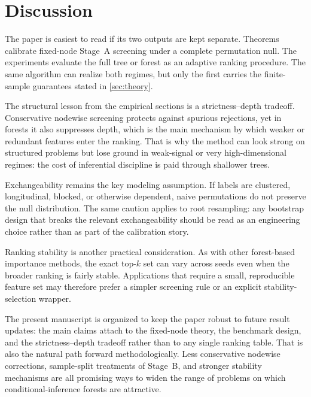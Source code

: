 \section{Discussion}
\label{sec:discussion}

The paper is easiest to read if its two outputs are kept separate. Theorems
calibrate fixed-node Stage~A screening under a complete permutation null. The
experiments evaluate the full tree or forest as an adaptive ranking procedure.
The same algorithm can realize both regimes, but only the first carries the
finite-sample guarantees stated in \cref{sec:theory}.

The structural lesson from the empirical sections is a strictness--depth
tradeoff. Conservative nodewise screening protects against spurious rejections,
yet in forests it also suppresses depth, which is the main mechanism by which
weaker or redundant features enter the ranking. That is why the method can
look strong on structured problems but lose ground in weak-signal or very
high-dimensional regimes: the cost of inferential discipline is paid through
shallower trees.

Exchangeability remains the key modeling assumption. If labels are clustered,
longitudinal, blocked, or otherwise dependent, naive permutations do not
preserve the null distribution. The same caution applies to root resampling:
any bootstrap design that breaks the relevant exchangeability should be read as
an engineering choice rather than as part of the calibration story.

Ranking stability is another practical consideration. As with other
forest-based importance methods, the exact top-$k$ set can vary across seeds
even when the broader ranking is fairly stable. Applications that require a
small, reproducible feature set may therefore prefer a simpler screening rule
or an explicit stability-selection wrapper.

The present manuscript is organized to keep the paper robust to future result
updates: the main claims attach to the fixed-node theory, the benchmark design,
and the strictness--depth tradeoff rather than to any single ranking table.
That is also the natural path forward methodologically. Less conservative
nodewise corrections, sample-split treatments of Stage~B, and stronger
stability mechanisms are all promising ways to widen the range of problems on
which conditional-inference forests are attractive.
